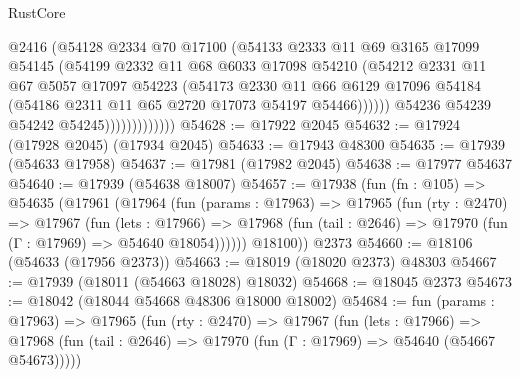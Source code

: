 \begin{lexlean}{RustCore}
\begin{coremodule}
                              @2416
                              (@54128
                                @2334
                                @70
                                @17100
                                (@54133
                                  @2333
                                  @11
                                  @69
                                  @3165
                                  @17099
                                  @54145
                                  (@54199
                                    @2332
                                    @11
                                    @68
                                    @6033
                                    @17098
                                    @54210
                                    (@54212
                                      @2331
                                      @11
                                      @67
                                      @5057
                                      @17097
                                      @54223
                                      (@54173
                                        @2330
                                        @11
                                        @66
                                        @6129
                                        @17096
                                        @54184
                                        (@54186 @2311 @11 @65 @2720 @17073 @54197 @54466))))))
                              @54236
                              @54239
                              @54242
                              @54245)))))))))))))
@54628 := @17922 @2045
@54632 := @17924 (@17928 @2045) (@17934 @2045)
@54633 := @17943 @48300
@54635 := @17939 (@54633 @17958)
@54637 := @17981 (@17982 @2045)
@54638 := @17977 @54637
@54640 := @17939 (@54638 @18007)
@54657 := @17938
    (fun (fn : @105) =>
    @54635
      (@17961
        (@17964
          (fun (params : @17963) =>
          @17965
            (fun (rty : @2470) =>
            @17967
              (fun (lets : @17966) =>
              @17968 (fun (tail : @2646) => @17970 (fun (Γ : @17969) => @54640 @18054))))))
        @18100))
    @2373
@54660 := @18106 (@54633 (@17956 @2373))
@54663 := @18019 (@18020 @2373) @48303
@54667 := @17939 (@18011 (@54663 @18028) @18032)
@54668 := @18045 @2373
@54673 := @18042 (@18044 @54668 @48306 @18000 @18002)
@54684 := fun (params : @17963) =>
  @17965
    (fun (rty : @2470) =>
    @17967
      (fun (lets : @17966) =>
      @17968 (fun (tail : @2646) => @17970 (fun (Γ : @17969) => @54640 (@54667 @54673)))))

\end{coremodule}
\end{lexlean}
